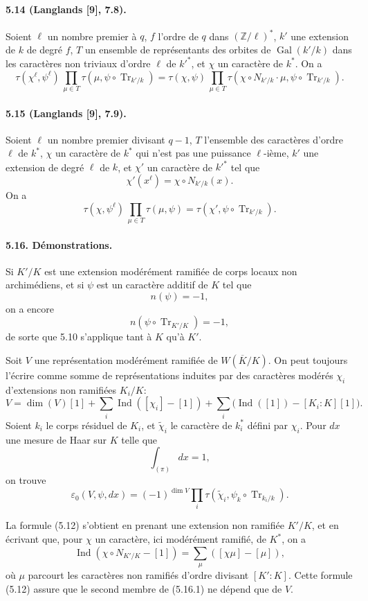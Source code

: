 \documentclass[10pt,letterpaper]{article}
\newcommand{\Gal}{\operatorname{Gal}}
\newcommand{\Ind}{\operatorname{Ind}}
\newcommand{\Tr}{\operatorname{Tr}}
\providecommand{\Gal}{\operatorname{Gal}}
\providecommand{\Gal}{\operatorname{Gal}}
\providecommand{\Tr}{\operatorname{Tr}}
\providecommand{\Gal}{\operatorname{Gal}}
\providecommand{\Tr}{\operatorname{Tr}}
\providecommand{\Gal}{\operatorname{Gal}}
\providecommand{\Tr}{\operatorname{Tr}}
\providecommand{\Ind}{\operatorname{Ind}}
\begin{document}
\paragraph{5.14 (Langlands [9], 7.8).} Soient \(\ell\) un nombre premier à \(q\), \(f\) l'ordre de \(q\) dans \((\mathbb Z/\ell)^*\), \(k'\) une extension de \(k\) de degré \(f\), \(T\) un ensemble de représentants des orbites de \(\Gal(k'/k)\) dans les caractères non triviaux d'ordre \(\ell\) de \(k'^*\), et \(\chi\) un caractère de \(k^*\). On a
\[
\tau(\chi^\ell,\psi^\ell)\,
\prod_{\mu\in T}\tau(\mu,\psi\circ\Tr_{k'/k})
=
\tau(\chi,\psi)\,
\prod_{\mu\in T}\tau(\chi\circ N_{k'/k}\cdot\mu,\psi\circ\Tr_{k'/k}).
\]

\paragraph{5.15 (Langlands [9], 7.9).} Soient \(\ell\) un nombre premier divisant \(q-1\), \(T\) l'ensemble des caractères d'ordre \(\ell\) de \(k^*\), \(\chi\) un caractère de \(k^*\) qui n'est pas une puissance \(\ell\)-ième, \(k'\) une extension de degré \(\ell\) de \(k\), et \(\chi'\) un caractère de \(k'^*\) tel que
\[
\chi'(x^\ell)=\chi\circ N_{k'/k}(x).
\]
On a
\[
\tau(\chi,\psi^\ell)\,
\prod_{\mu\in T}\tau(\mu,\psi)
=
\tau(\chi',\psi\circ\Tr_{k'/k}).
\]

\paragraph{5.16. Démonstrations.} Si \(K'/K\) est une extension modérément ramifiée de corps locaux non archimédiens, et si \(\psi\) est un caractère additif de \(K\) tel que
\[
n(\psi)=-1,
\]
on a encore
\[
n(\psi\circ\Tr_{K'/K})=-1,
\]
de sorte que 5.10 s'applique tant à \(K\) qu'à \(K'\).

Soit \(V\) une représentation modérément ramifiée de \(W(\overline K/K)\). On peut toujours l'écrire comme somme de représentations induites par des caractères modérés \(\chi_i\) d'extensions non ramifiées \(K_i/K\):
\[
V=\dim(V)[1]+\sum_i\Ind([\chi_i]-[1])
+\sum_i\bigl(\Ind([1])-[K_i:K][1]\bigr).
\]
Soient \(k_i\) le corps résiduel de \(K_i\), et \(\widetilde\chi_i\) le caractère de \(k_i^*\) défini par \(\chi_i\). Pour \(dx\) une mesure de Haar sur \(K\) telle que
\[
\int_{(\pi)}dx=1,
\]
on trouve
\[
\tag{5.16.1}
\varepsilon_0(V,\psi,dx)
=
(-1)^{\dim V}
\prod_i\tau(\widetilde\chi_i,\psi_k\circ\Tr_{k_i/k}).
\]

La formule (5.12) s'obtient en prenant une extension non ramifiée \(K'/K\), et en écrivant que, pour \(\chi\) un caractère, ici modérément ramifié, de \(K^*\), on a
\[
\Ind(\chi\circ N_{K'/K}-[1])
=
\sum_\mu([\chi\mu]-[\mu]),
\]
où \(\mu\) parcourt les caractères non ramifiés d'ordre divisant \([K':K]\). Cette formule (5.12) assure que le second membre de (5.16.1) ne dépend que de \(V\).
\end{document}
